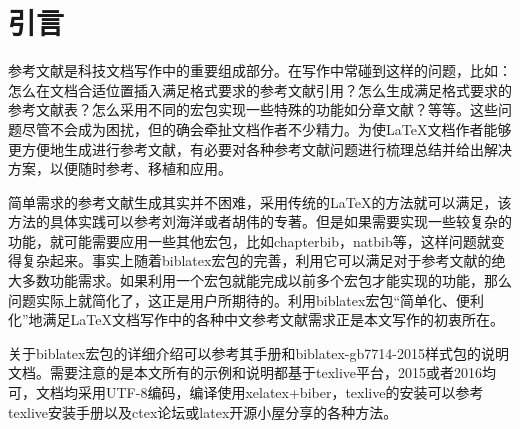 \documentclass[twoside]{article} %
\begin{document}
\section{引言}

参考文献是科技文档写作中的重要组成部分。在写作中常碰到这样的问题，比如：怎么在文档合适位置插入满足格式要求的参考文献引用？怎么生成满足格式要求的参考文献表？怎么采用不同的宏包实现一些特殊的功能如分章文献？等等。这些问题尽管不会成为困扰，但的确会牵扯文档作者不少精力。为使\LaTeX 文档作者能够更方便地生成进行参考文献，有必要对各种参考文献问题进行梳理总结并给出解决方案，以便随时参考、移植和应用。

简单需求的参考文献生成其实并不困难，采用传统的\LaTeX 的方法就可以满足，该方法的具体实践可以参考刘海洋\cite{刘海洋2013--}或者胡伟\cite{胡伟2011--}的专著。但是如果需要实现一些较复杂的功能，就可能需要应用一些其他宏包，比如chapterbib，natbib等，这样问题就变得复杂起来。事实上随着biblatex宏包的完善，利用它可以满足对于参考文献的绝大多数功能需求。如果利用一个宏包就能完成以前多个宏包才能实现的功能，那么问题实际上就简化了，这正是用户所期待的。利用biblatex宏包“简单化、便利化”地满足\LaTeX 文档写作中的各种中文参考文献需求正是本文写作的初衷所在。

关于biblatex宏包的详细介绍可以参考其手册\cite{Lehman2015}和biblatex-gb7714-2015样式包的说明文档\cite{胡振震2016}。需要注意的是本文所有的示例和说明都基于texlive平台，2015或者2016均可，文档均采用UTF-8编码，编译使用xelatex+biber，texlive的安装可以参考texlive安装手册\cite{Berry2016--}以及ctex论坛或latex开源小屋分享的各种方法。
\end{document}
